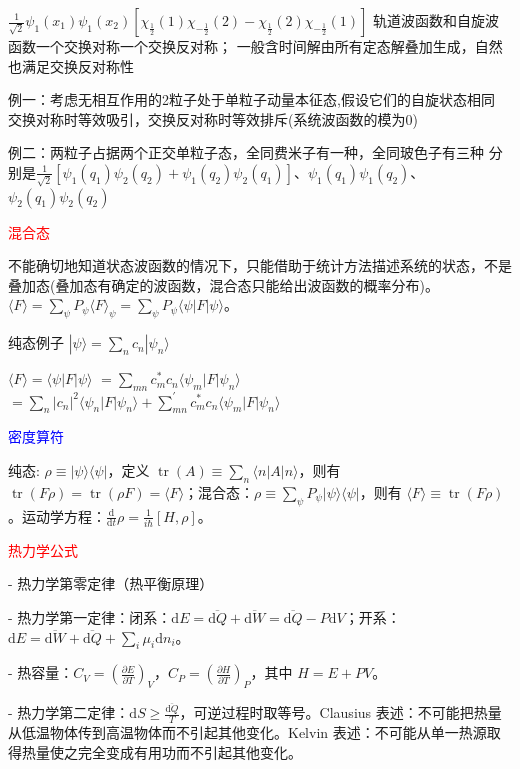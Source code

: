 \documentclass[a4paper,8pt]{extarticle} %
\newcommand{\bluetext}[1]{\textcolor{blue}{#1}}
\newcommand{\redtext}[1]{\textcolor{red}{#1}}
\begin{document}
\begin{multicols}{3}
$\frac{1}{\sqrt{2}}\psi_1(x_1)\psi_1(x_2)[\chi_{\frac{1}{2}}(1)\chi_{-\frac{1}{2}}(2)-\chi_{\frac{1}{2}}(2)\chi_{-\frac{1}{2}}(1)]$
轨道波函数和自旋波函数一个交换对称一个交换反对称；
一般含时间解由所有定态解叠加生成，自然也满足交换反对称性

例一：考虑无相互作用的2粒子处于单粒子动量本征态,假设它们的自旋状态相同
交换对称时等效吸引，交换反对称时等效排斥(系统波函数的模为0)

例二：两粒子占据两个正交单粒子态，全同费米子有一种，全同玻色子有三种
分别是$\frac{1}{\sqrt{2}}[\psi_1(q_1)\psi_2(q_2)+\psi_1(q_2)\psi_2(q_1)]$、$\psi_1(q_1)\psi_1(q_2)$、$\psi_2(q_1)\psi_2(q_2)$

\redtext{混合态}

不能确切地知道状态波函数的情况下，只能借助于统计方法描述系统的状态，不是叠加态(叠加态有确定的波函数，混合态只能给出波函数的概率分布)。$\langle F \rangle = \sum_{\psi} P_{\psi}\langle F \rangle_{\psi} = \sum_{\psi} P_{\psi} \langle\psi| F |\psi\rangle$。

纯态例子 $|\psi\rangle=\sum_{n}c_n|\psi_n\rangle$

$\langle F \rangle=\langle\psi|F|\psi\rangle$
$=\sum_{mn}c_m^*c_n\langle\psi_m|F|\psi_n\rangle$
$=\sum_n|c_n|^2\langle\psi_n|F|\psi_n\rangle+\sum_{mn}^\prime c_m^*c_n\langle\psi_m|F|\psi_n\rangle$

\bluetext{密度算符}

纯态: $\rho \equiv |\psi\rangle \langle\psi|$，定义 $\operatorname{tr}(A) \equiv \sum_{n}\langle n|A|n\rangle$，则有 $\operatorname{tr}(F\rho) = \operatorname{tr}(\rho F) = \langle F \rangle$；混合态：$\rho \equiv \sum_{\psi} P_{\psi}|\psi\rangle \langle\psi|$，则有 $\langle F \rangle \equiv \operatorname{tr}(F\rho)$。运动学方程：$\frac{\mathrm{d}}{\mathrm{d}t}\rho = \frac{1}{i\hbar}[H,\rho]$。

\redtext{热力学公式}

- 热力学第零定律（热平衡原理）

- 热力学第一定律：闭系：$\mathrm{d}E = \overline{\mathrm{d}Q} + \overline{\mathrm{d}W} = \overline{\mathrm{d}Q} - P\mathrm{d}V$；开系：$\mathrm{d}E = \overline{\mathrm{d}W} + \overline{\mathrm{d}Q} + \sum_i \mu_i\mathrm{d}n_i$。

- 热容量：$C_V = \left(\frac{\partial E}{\partial T}\right)_V$，$C_P = \left(\frac{\partial H}{\partial T}\right)_P$，其中 $H = E + PV$。

- 热力学第二定律：$\mathrm{d}S \geq \frac{\overline{\mathrm{d}Q}}{T}$，可逆过程时取等号。Clausius 表述：不可能把热量从低温物体传到高温物体而不引起其他变化。Kelvin 表述：不可能从单一热源取得热量使之完全变成有用功而不引起其他变化。


\end{multicols}
\end{document}
